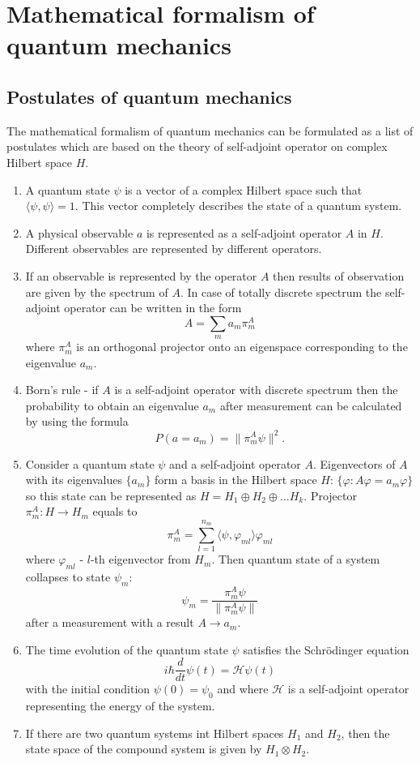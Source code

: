 \documentclass[11pt]{article}
\begin{document}
\section{Mathematical formalism of quantum mechanics}
\subsection{Postulates of quantum mechanics }
The mathematical formalism of quantum mechanics can be formulated as a list of postulates \cite{Khrennikov_information} which are based on the theory of self-adjoint operator on complex Hilbert space $H$. 
\begin{enumerate}[label=\bfseries Postulate \arabic*:, align=left]
  \item A quantum state $\psi$ is a vector of a complex Hilbert space such that $\langle\psi, \psi\rangle = 1$. This vector completely describes the state of a quantum system.
  \item A physical observable $a$ is represented as a self-adjoint operator $A$ in $H$. Different observables are represented by different operators.
  \item If an observable is represented by the operator $A$ then results of observation are given by the spectrum of $A$. In case of totally discrete spectrum the self-adjoint operator can be written in the form 
  \[
  A = \sum_m a_m\pi_m^A
  \]
    where $\pi_m^A$ is an orthogonal projector onto an eigenspace corresponding to the eigenvalue $a_m$.
  \item Born's rule - if $A$ is a self-adjoint operator with discrete spectrum then the probability to obtain an eigenvalue $a_m$ after measurement can be calculated by using the formula
  \[
  P(a = a_m) = \| \pi_m^A\psi\|^2.
  \]
  \item 
  Consider a quantum state $\psi$ and a self-adjoint operator $A$. Eigenvectors of $A$ with its eigenvalues $\{a_m\}$ form a basis in the Hilbert space $H$: $\{ \varphi: A\varphi = a_m\varphi\}$ so this state can be represented as $H = H_1\oplus H_2\oplus\ldots H_k$. Projector $\pi_m^A: H\to H_m$ equals to 
  \[
  \pi_m^A = \sum_{l = 1}^{n_m}\langle\psi,\varphi_{ml}\rangle\varphi_{ml}
  \]
  where $\varphi_{ml}$ - $l$-th eigenvector from $H_m$.
  Then quantum state of a system collapses to state $\psi_m$:
  \[
  \psi_m = \frac{\pi_m^A\psi}{ \| \pi_m^A\psi\|}
  \] 
  after a measurement with a result $A \to a_m$.
  \item The time evolution of the quantum state $\psi$ satisfies the Schr\"{o}dinger equation
  \[
  i\hbar \dfrac{d}{dt}\psi(t) = \mathcal{\mathcal{H}}\psi(t)
  \] 
  with the initial condition $\psi(0) = \psi_0$ and
  where $\mathcal{H}$ is a self-adjoint operator representing the energy of the system.
  \item If there are two quantum systems int Hilbert spaces $H_1$ and $H_2$, then the state space of the compound system is given by $H_1 \otimes H_2$.  
\end{enumerate}
\end{document}
